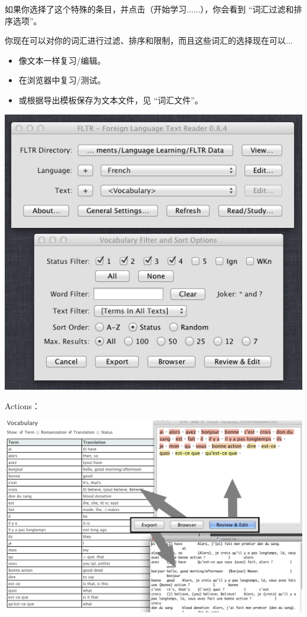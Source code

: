 \documentclass[cn,10pt,math=newtx,citestyle=gb7714-2015,bibstyle=gb7714-2015]{elegantbook}
\begin{document}
如果你选择了这个特殊的条目，并点击（开始学习......），你会看到 “词汇过滤和排序选项”。

你现在可以对你的词汇进行过滤、排序和限制，而且这些词汇的选择现在可以...

\begin{itemize}
    \item 像文本一样复习/编辑。
     \item 在浏览器中复习/测试。
     \item 或根据导出模板保存为文本文件，见 “词汇文件”。
    
\end{itemize}

\includegraphics[scale=0.6]{image/images-044.png}

Actions：

\includegraphics[scale=0.3]{image/images-045.png}
\end{document}
